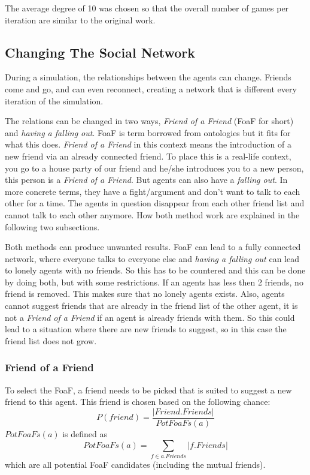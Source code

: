 The average degree of 10 was chosen so that the overall number of games per iteration are similar to the original work.

\subsection{Changing The Social Network}
During a simulation, the relationships between the agents can change.
Friends come and go, and can even reconnect, creating a network that is different every iteration of the simulation.

The relations can be changed in two ways, \textit{Friend of a Friend} (FoaF for short) and \textit{having a falling out}.
FoaF is term borrowed from ontologies but it fits for what this does.
\textit{Friend of a Friend} in this context means the introduction of a new friend via an already connected friend.
To place this is a real-life context, you go to a house party of our friend and he/she introduces you to a new person, this person is a \textit{Friend of a Friend}.
But agents can also have a \textit{falling out}.
In more concrete terms, they have a fight/argument and don't want to talk to each other for a time.
The agents in question disappear from each other friend list and cannot talk to each other anymore.
How both method work are explained in the following two subsections.

Both methods can produce unwanted results.
FoaF can lead to a fully connected network, where everyone talks to everyone else and \textit{having a falling out} can lead to lonely agents with no friends.
So this has to be countered and this can be done by doing both, but with some restrictions.
If an agents has less then 2 friends, no friend is removed.
This makes sure that no lonely agents exists.
Also, agents cannot suggest friends that are already in the friend list of the other agent, it is not a \textit{Friend of a Friend} if an agent is already friends with them.
So this could lead to a situation where there are new friends to suggest, so in this case the friend list does not grow.

\subsubsection{Friend of a Friend}
To select the FoaF, a friend needs to be picked that is suited to suggest a new friend to this agent.
This friend is chosen based on the following chance:
\begin{equation}
    P(friend) = \frac{|Friend.Friends|}{PotFoaFs(a)}
\end{equation}
$PotFoaFs(a)$ is defined as
\[
    PotFoaFs(a) = \sum_{f \in a.Friends} |f.Friends|
\]
which are all potential FoaF candidates (including the mutual friends).

